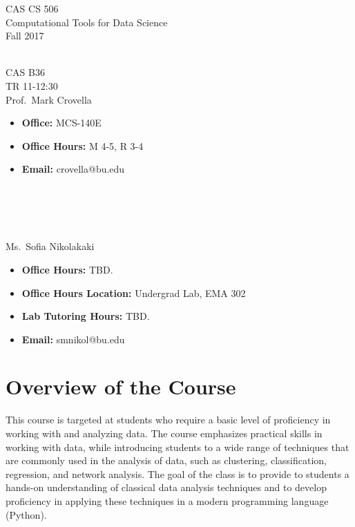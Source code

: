 \documentclass[11pt]{article}
\begin{document}
\sloppy 
\begin{center}
\LARGE CAS CS 506\\
\Large Computational Tools for Data Science\\
\Large\rm Fall 2017\\~\\
\end{center}

 CAS B36\\[\baselineskip]
 TR 11-12:30
\\[\baselineskip] 

 Prof.\ Mark Crovella\\[0.75\baselineskip]
\begin{minipage}[t]{0.60\textwidth}
\begin{itemize}
\item {\bf Office:} MCS-140E
\item {\bf Office Hours:} {\small M 4-5, R 3-4}
\item {\bf Email:} crovella@bu.edu
\end{itemize}
\end{minipage}
~\\~\\~\\~\\
  Ms.\ Sofia Nikolakaki\\[0.75\baselineskip]
 \begin{minipage}[t]{0.60\textwidth}
 \begin{itemize}
 \item {\bf Office Hours:} {\small TBD.}
 \item {\bf Office Hours Location:} Undergrad Lab, EMA 302
 \item {\bf Lab Tutoring Hours:} {\small TBD.}
 \item {\bf Email:} smnikol@bu.edu
 \end{itemize}
 \end{minipage}

\section*{Overview of the Course}

This course is targeted at students who require a basic level of
proficiency in working with and analyzing data.  The course emphasizes
practical skills in working with data, while introducing students to a
wide range of techniques that are commonly used in the analysis of data,
such as clustering, classification, regression, and network analysis.
The goal of the class is to provide to students a hands-on understanding
of classical data analysis techniques and to develop proficiency in
applying these techniques in a modern programming language (Python). 
\end{document}
